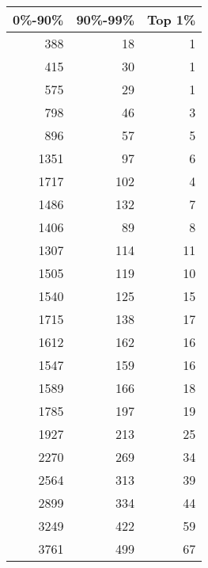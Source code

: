 \begin{table}[ht]
\centering
\begin{tabular}{rrr}
  \hline
0\%-90\% & 90\%-99\% & Top 1\% \\ 
  \hline
388 &  18 &   1 \\ 
  415 &  30 &   1 \\ 
  575 &  29 &   1 \\ 
  798 &  46 &   3 \\ 
  896 &  57 &   5 \\ 
  1351 &  97 &   6 \\ 
  1717 & 102 &   4 \\ 
  1486 & 132 &   7 \\ 
  1406 &  89 &   8 \\ 
  1307 & 114 &  11 \\ 
  1505 & 119 &  10 \\ 
  1540 & 125 &  15 \\ 
  1715 & 138 &  17 \\ 
  1612 & 162 &  16 \\ 
  1547 & 159 &  16 \\ 
  1589 & 166 &  18 \\ 
  1785 & 197 &  19 \\ 
  1927 & 213 &  25 \\ 
  2270 & 269 &  34 \\ 
  2564 & 313 &  39 \\ 
  2899 & 334 &  44 \\ 
  3249 & 422 &  59 \\ 
  3761 & 499 &  67 \\ 
   \hline
\end{tabular}
\end{table}
